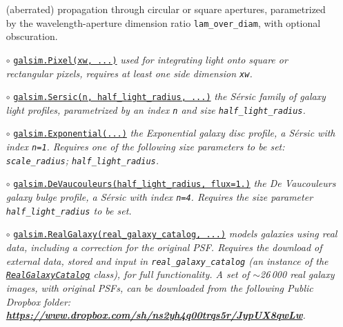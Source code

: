 \documentclass[preprint,11pt]{aastex}
\begin{document}
\begin{itemize}
{  (aberrated) propagation through circular or square apertures, parametrized by the wavelength-aperture
  dimension ratio \texttt{lam\_over\_diam}, with
  optional obscuration.}
\item[$\circ$]
  \href{http://galsim-developers.github.com/GalSim/classgalsim_1_1base_1_1_pixel.html}{\texttt{galsim.Pixel(xw,
    ...)}} \newline \emph{used for integrating light onto square or
  rectangular pixels, requires at least one side dimension \texttt{xw}.}
\item[$\circ$]
  \href{http://galsim-developers.github.com/GalSim/classgalsim_1_1base_1_1_sersic.html}{\texttt{galsim.Sersic(n,
      half\_light\_radius, ...)}} \newline\emph{ the S\'{e}rsic family of galaxy light
  profiles, parametrized by an index \texttt{n} and size \texttt{half\_light\_radius}.}
\item[$\circ$]
  \href{http://galsim-developers.github.com/GalSim/classgalsim_1_1base_1_1_exponential.html}{\texttt{galsim.Exponential(...)}}
  \newline \emph{the Exponential galaxy disc profile, a S\'{e}rsic
    with index \texttt{n=1}.  Requires one of the
    following size parameters to be set: \texttt{scale\_radius}; \texttt{half\_light\_radius}.}
\item[$\circ$]
  \href{http://galsim-developers.github.com/GalSim/classgalsim_1_1base_1_1_de_vaucouleurs.html}{\texttt{galsim.DeVaucouleurs(half\_light\_radius,
      flux=1.)}}
  \newline \emph{the De Vaucouleurs galaxy bulge profile, a S\'{e}rsic
    with index \texttt{n=4}.  Requires the size parameter
    \texttt{half\_light\_radius} to be set.}
\item[$\circ$]
  \href{http://galsim-developers.github.com/GalSim/classgalsim_1_1base_1_1_real_galaxy.html}{\texttt{galsim.RealGalaxy(real\_galaxy\_catalog,
      ...)}} \newline \emph{models galaxies using real
  data, including a correction for the original PSF.  Requires the
  download of external data, stored and input in \texttt{real\_galaxy\_catalog} (an instance of the
  \href{http://galsim-developers.github.com/GalSim/classgalsim_1_1real_1_1_real_galaxy_catalog.html}{\texttt{RealGalaxyCatalog}}
  class), for full functionality.  A set of $\sim$26\,000 real galaxy
  images, with original PSFs, can be downloaded from the following
  Public Dropbox folder: \newline
  \href{https://www.dropbox.com/sh/ns2yh4q00trqs5r/JypUX8qwLw}{{\bf https://www.dropbox.com/sh/ns2yh4q00trqs5r/JypUX8qwLw}}.}

\end{itemize}
\end{document}
